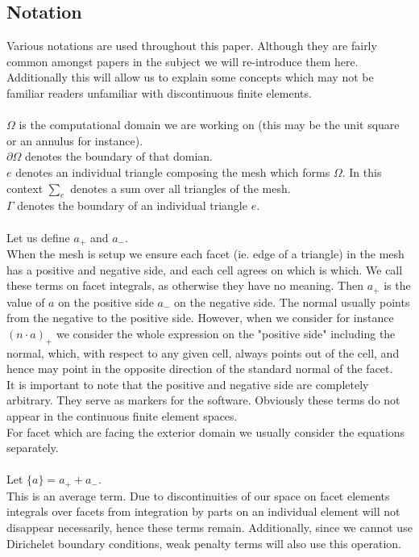 \documentclass[11pt,twoside,a4paper]{article}
\begin{document}
\subsection{Notation}
Various notations are used throughout this paper. Although they are fairly common amongst papers in the subject we will re-introduce them here. Additionally this will allow us to explain some concepts which may not be familiar readers unfamiliar with discontinuous finite elements.\\
\\
$\Omega$ is the computational domain we are working on (this may be the unit square or an annulus for instance).\\
$\partial \Omega$ denotes the boundary of that domian.\\
$e$ denotes an individual triangle composing the mesh which forms $\Omega$. In this context $\sum_e$ denotes a sum over all triangles of the mesh.\\
$\Gamma$ denotes the boundary of an individual triangle $e$.\\
\\
Let us define $a_+$ and $a_-$.\\
When the mesh is setup we ensure each facet (ie. edge of a triangle) in the mesh has a positive and negative side, and each cell agrees on which is which. We call these terms on facet integrals, as otherwise they have no meaning. Then $a_+$ is the value of $a$ on the positive side $a_-$ on the negative side. The normal usually points from the negative to the positive side. However, when we consider for instance $(n \cdot a)_+$ we consider the whole expression on the "positive side" including the normal, which, with respect to any given cell, always points out of the cell, and hence may point in the opposite direction of the standard normal of the facet.\\
It is important to note that the positive and negative side are completely arbitrary. They serve as markers for the software. Obviously these terms do not appear in the continuous finite element spaces.\\
For facet which are facing the exterior domain we usually consider the equations separately.\\
\\
Let $\{ a \} = a_+ + a_-$. \\
This is an average term. Due to discontinuities of our space on facet elements integrals over facets from integration by parts on an individual element will not disappear necessarily, hence these terms remain. Additionally, since we cannot use Dirichelet boundary conditions, weak penalty terms will also use this operation.\\
\end{document}
